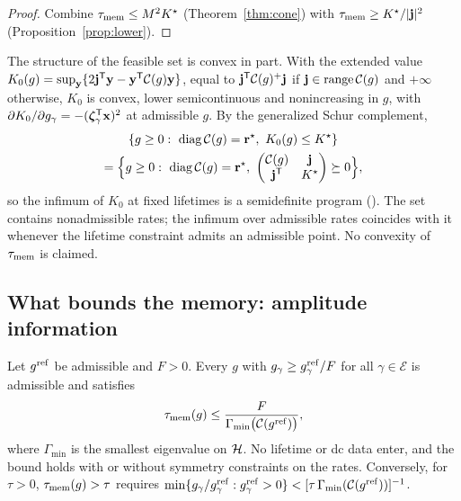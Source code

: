 \begin{proof}
Combine $\tau_{\rm mem}\le M^2K^\star$ (Theorem~\ref{thm:cone}) with $\tau_{\rm mem}\ge K^\star/|\mathbf j|^2$
(Proposition~\ref{prop:lower}).
\end{proof}

The structure of the feasible set is convex in part. With the extended value
$K_0(g)=\sup_{\mathbf y}\{2\mathbf j^{\mathsf T}\mathbf y-\mathbf y^{\mathsf T}\mathcal C(g)\mathbf y\}$, equal to $\mathbf j^{\mathsf T}\mathcal C(g)^+\mathbf j$ if
$\mathbf j\in\mathrm{range}\,\mathcal C(g)$ and $+\infty$ otherwise, $K_0$ is convex, lower semicontinuous and
nonincreasing in $g$, with $\partial K_0/\partial g_\gamma=-(\bm\zeta_\gamma^{\mathsf T}\mathbf x)^2$ at admissible $g$.
By the generalized Schur complement,
\begin{multline}
\{g\ge0:\ \mathrm{diag}\,\mathcal C(g)=\mathbf r^\star,\ K_0(g)\le K^\star\}\\
=\Big\{g\ge0:\ \mathrm{diag}\,\mathcal C(g)=\mathbf r^\star,\
\begin{pmatrix}\mathcal C(g)&\mathbf j\\ \mathbf j^{\mathsf T}&K^\star\end{pmatrix}\succeq0\Big\},
\label{eq:lmi}
\end{multline}
so the infimum of $K_0$ at fixed lifetimes is a semidefinite program (). The set contains
nonadmissible rates; the infimum over admissible rates coincides with it whenever the lifetime
constraint admits an admissible point. No convexity of $\tau_{\rm mem}$ is claimed.

\subsection{What bounds the memory: amplitude information}\label{sec:prior}

\begin{proposition}\label{prop:prior}
Let $g^{\rm ref}$ be admissible and $F>0$. Every $g$ with $g_\gamma\ge g^{\rm ref}_\gamma/F$ for all
$\gamma\in\mathcal E$ is admissible and satisfies
\begin{equation}
\tau_{\rm mem}(g)\le\frac{F}{\Gamma_{\min}\big(\mathcal C(g^{\rm ref})\big)},
\label{eq:prior}
\end{equation}
where $\Gamma_{\min}$ is the smallest eigenvalue on $\mathcal H$. No lifetime or dc data enter, and the bound
holds with or without symmetry constraints on the rates. Conversely, for $\tau>0$, $\tau_{\rm mem}(g)>\tau$ requires
$\min\{g_\gamma/g^{\rm ref}_\gamma:g^{\rm ref}_\gamma>0\}<[\tau\,\Gamma_{\min}(\mathcal C(g^{\rm ref}))]^{-1}$.
\end{proposition}

